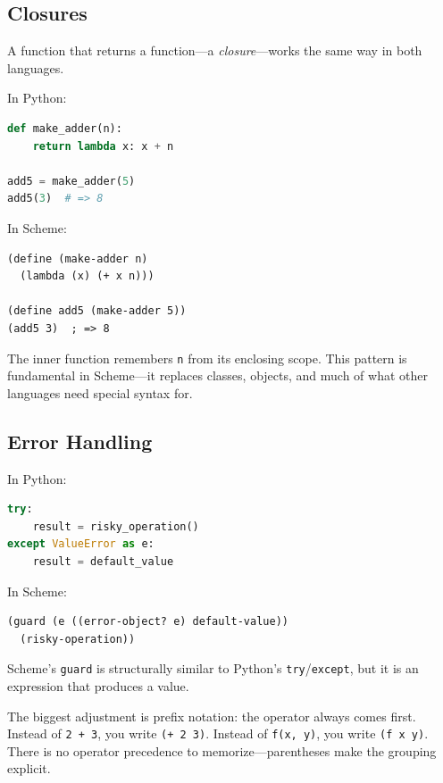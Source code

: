 \subsection{Closures}

A function that returns a function---a \emph{closure}---works the same way in both languages.

In Python:

\begin{lstlisting}[language=Python, style=scheme, keywordstyle=\bfseries]
def make_adder(n):
    return lambda x: x + n

add5 = make_adder(5)
add5(3)  # => 8
\end{lstlisting}

In Scheme:

\begin{lstlisting}
(define (make-adder n)
  (lambda (x) (+ x n)))

(define add5 (make-adder 5))
(add5 3)  ; => 8
\end{lstlisting}

The inner function remembers \texttt{n} from its enclosing scope. This pattern is fundamental in Scheme---it replaces classes, objects, and much of what other languages need special syntax for.

\subsection{Error Handling}

In Python:

\begin{lstlisting}[language=Python, style=scheme, keywordstyle=\bfseries]
try:
    result = risky_operation()
except ValueError as e:
    result = default_value
\end{lstlisting}

In Scheme:

\begin{lstlisting}
(guard (e ((error-object? e) default-value))
  (risky-operation))
\end{lstlisting}

Scheme's \texttt{guard} is structurally similar to Python's \texttt{try}/\texttt{except}, but it is an expression that produces a value.

\begin{note}
The biggest adjustment is prefix notation: the operator always comes first. Instead of \texttt{2 + 3}, you write \texttt{(+ 2 3)}. Instead of \texttt{f(x, y)}, you write \texttt{(f x y)}. There is no operator precedence to memorize---parentheses make the grouping explicit.
\end{note}

